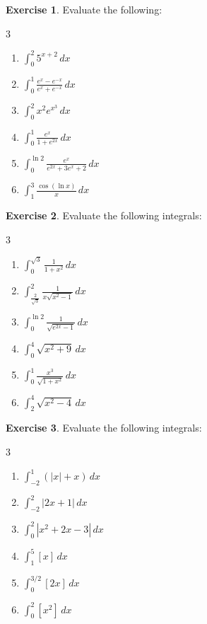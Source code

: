 \documentclass{book}
\theoremstyle{definition}
\newtheorem{exercise}{Exercise}[section]
\begin{document}
\begin{exercise}
 Evaluate the following:
\begin{multicols}{3}
\begin{enumerate}[label=(\roman*)]
    \item $\displaystyle\int_0^2 5^{x+2}\,dx$
    \item $\displaystyle\int_0^1 \frac{e^x-e^{-x}}{e^x+e^{-x}}\,dx$
    \item $\displaystyle\int_0^2 x^2e^{x^3}\,dx$
    \item $\displaystyle\int_0^1\frac{e^x}{1+e^{2x}}\,dx$
    \item $\displaystyle\int_0^{\ln 2}\frac{e^x}{e^{2x}+3e^x+2}\,dx$
    \item $\displaystyle\int_1^3\frac{\cos (\ln x)}{x}\,dx$
    
\end{enumerate}
\end{multicols}
\end{exercise}

\begin{exercise}
 Evaluate the following integrals:
\begin{multicols}{3}
\begin{enumerate}[label=(\roman*)]
    \item $\displaystyle\int_0^{\sqrt{3}} \frac{1}{1+x^2}\,dx$
    \item $\displaystyle\int_\frac{2}{\sqrt{3}}^{2}\frac{1}{x\sqrt{x^2-1}}\,dx$
    \item $\displaystyle\int_0^{\ln 2} \frac{1}{\sqrt{e^{2x}-1}}\,dx$
    \item $\displaystyle\int_0^4\sqrt{x^2+9}\,dx$
    \item $\displaystyle\int_0^1 \frac{x^3}{\sqrt{1+x^2}}\,dx$
    \item $\displaystyle\int_2^4 \sqrt{x^2-4}\,dx$

\end{enumerate}
\end{multicols}
\end{exercise}

\begin{exercise}
 Evaluate the following integrals:
\begin{multicols}{3}
\begin{enumerate}[label=(\roman*)]
    \item $\displaystyle\int_{-2}^1 (|x|+x)\,dx$
    \item $\displaystyle\int_{-2}^2 |2x+1|\,dx$
    \item $\displaystyle\int_0^2|x^2+2x-3|\,dx$
    \item $\displaystyle\int_1^5 [x]\,dx$
    \item $\displaystyle\int_0^{3/2}[2x]\,dx$
    \item $\displaystyle\int_0^2[x^2]\,dx$
   
\end{enumerate}
\end{multicols}
\end{exercise}
\end{document}
